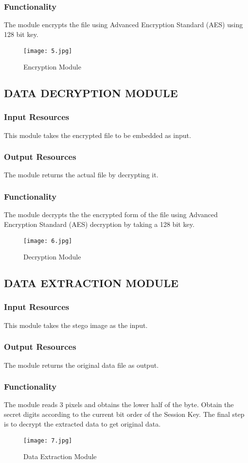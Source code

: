 \documentclass[12pt]{report}
\begin{document}
\subsubsection{Functionality}
The module encrypts the file using Advanced Encryption Standard (AES) using 128 bit key.
\begin{figure}[h!]
	\centering
		\texttt{[image: 5.jpg]}
		\caption{Encryption Module}
\end{figure} 
\pagebreak
\subsection{DATA DECRYPTION MODULE}
\subsubsection{Input Resources}
This module takes the encrypted file to be embedded as input.
\subsubsection{Output Resources}
The module returns the actual file by decrypting it.
\subsubsection{Functionality}
The module decrypts the the encrypted form of the file using Advanced Encryption Standard (AES) decryption by taking a 128 bit key.
\begin{figure}[h!]
	\centering
		\texttt{[image: 6.jpg]}
		\caption{Decryption Module}
\end{figure} 
\pagebreak
\subsection{DATA EXTRACTION MODULE}
\subsubsection{Input Resources}
This module takes the stego image as the input.
\subsubsection{Output Resources}
The module returns the original data file as output.
\subsubsection{Functionality}
The module reads 3 pixels and obtains the lower half of the byte. Obtain the secret digits according to the current bit order of the Session Key. The final step is to  decrypt the extracted data to get original data.
\pagebreak
\begin{figure}[h!]
	\centering
		\texttt{[image: 7.jpg]}
		\caption{Data Extraction Module}
\end{figure} 
\pagebreak
\end{document}
